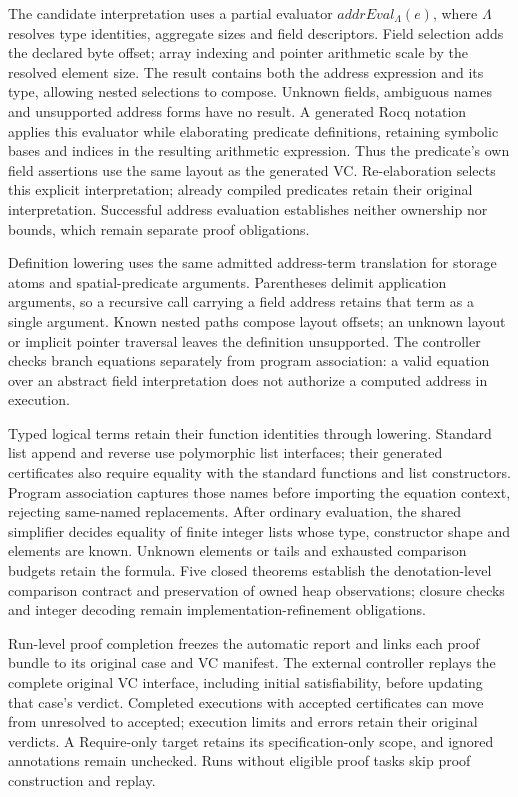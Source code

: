 The candidate interpretation uses a partial evaluator
$\mathit{addrEval}_{\Lambda}(e)$, where $\Lambda$ resolves type identities,
aggregate sizes and field descriptors. Field selection adds the declared byte
offset; array indexing and pointer arithmetic scale by the resolved element
size. The result contains both the address expression and its type, allowing
nested selections to compose. Unknown fields, ambiguous names and unsupported
address forms have no result. A generated Rocq notation applies this evaluator
while elaborating predicate definitions, retaining symbolic bases and indices
in the resulting arithmetic expression. Thus the predicate's own field
assertions use the same layout as the generated VC. Re-elaboration selects
this explicit interpretation; already compiled predicates retain their
original interpretation. Successful address evaluation establishes neither
ownership nor bounds, which remain separate proof obligations.

Definition lowering uses the same admitted address-term translation for storage
atoms and spatial-predicate arguments. Parentheses delimit application arguments,
so a recursive call carrying a field address retains that term as a single
argument. Known nested paths compose layout offsets; an unknown layout or
implicit pointer traversal leaves the definition unsupported. The controller
checks branch equations separately from program association: a valid equation
over an abstract field interpretation does not authorize a computed address in
execution.

Typed logical terms retain their function identities through lowering. Standard
list append and reverse use polymorphic list interfaces; their generated
certificates also require equality with the standard functions and list
constructors. Program association captures those names before importing the
equation context, rejecting same-named replacements. After ordinary evaluation,
the shared simplifier decides equality of finite integer lists whose type,
constructor shape and elements are known. Unknown elements or tails and exhausted
comparison budgets retain the formula. Five closed theorems establish the
denotation-level comparison contract and preservation of owned heap observations;
closure checks and integer decoding remain implementation-refinement obligations.

Run-level proof completion freezes the automatic report and links each proof
bundle to its original case and VC manifest. The external controller replays
the complete original VC interface, including initial satisfiability, before
updating that case's verdict. Completed executions with accepted certificates
can move from unresolved to accepted; execution limits and errors retain their
original verdicts. A Require-only target retains its specification-only scope,
and ignored annotations remain unchecked. Runs without eligible proof tasks
skip proof construction and replay.

